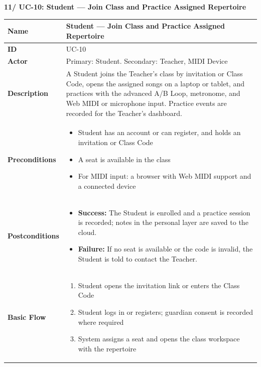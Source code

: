 \documentclass[a4paper]{article}
\newlength{\ucLeft}
\begin{document}
\vspace{0.5em}
\noindent\textbf{11/ UC-10: Student --- Join Class and Practice Assigned Repertoire}

\begin{longtable}{|>{\bfseries}p{\ucLeft}|p{\dimexpr\linewidth-\ucLeft-2\tabcolsep-2\arrayrulewidth}|}
\hline
Name & Student --- Join Class and Practice Assigned Repertoire \\ \hline
ID & UC-10 \\ \hline
Actor & Primary: Student. Secondary: Teacher, MIDI Device \\ \hline
Description & A Student joins the Teacher's class by invitation or Class Code, opens the assigned songs on a laptop or tablet, and practices with the advanced A/B Loop, metronome, and Web MIDI or microphone input. Practice events are recorded for the Teacher's dashboard. \\ \hline
Preconditions &
\begin{itemize}[leftmargin=1em, nosep, topsep=2pt, partopsep=0pt, parsep=0pt, after=\strut]
    \item Student has an account or can register, and holds an invitation or Class Code
    \item A seat is available in the class
    \item For MIDI input: a browser with Web MIDI support and a connected device
\end{itemize}
\\ \hline
Postconditions &
\begin{itemize}[leftmargin=1em, nosep, topsep=2pt, partopsep=0pt, parsep=0pt, after=\strut]
    \item \textbf{Success:} The Student is enrolled and a practice session is recorded; notes in the personal layer are saved to the cloud.
    \item \textbf{Failure:} If no seat is available or the code is invalid, the Student is told to contact the Teacher.
\end{itemize}
\\ \hline
Basic Flow &
\begin{enumerate}[leftmargin=1.5em, nosep, topsep=2pt, partopsep=0pt, parsep=0pt, after=\strut]
    \item Student opens the invitation link or enters the Class Code
    \item Student logs in or registers; guardian consent is recorded where required
    \item System assigns a seat and opens the class workspace with the repertoire

\end{enumerate}
\end{longtable}
\end{document}
